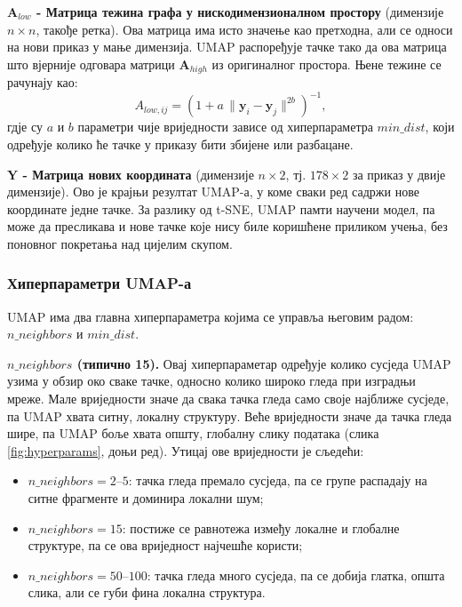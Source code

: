 \documentclass{article}
\begin{document}
	\textbf{$\mathbf{A}_{low}$ - Матрица тежина графа у нискодимензионалном простору} (димензије $n \times n$, такође ретка). Ова матрица има исто значење као претходна, али се односи на нови приказ у мање димензија. UMAP распоређује тачке тако да ова матрица што вјерније одговара матрици $\mathbf{A}_{high}$ из оригиналног простора. Њене тежине се рачунају као:
	\begin{equation} \label{eq:umap_alow}
		A_{low,ij} = \left(1 + a\,\|\mathbf{y}_i - \mathbf{y}_j\|^{2b}\right)^{-1},
	\end{equation}
	гдје су $a$ и $b$ параметри чије вриједности зависе од хиперпараметра $min\_dist$, који одређује колико ће тачке у приказу бити збијене или разбацане.
	
	\textbf{$\mathbf{Y}$ - Матрица нових координата} (димензије $n \times 2$, тј. $178 \times 2$ за приказ у двије димензије). Ово је крајњи резултат UMAP-а, у коме сваки ред садржи нове координате једне тачке. За разлику од t-SNE, UMAP памти научени модел, па може да пресликава и нове тачке које нису биле коришћене приликом учења, без поновног покретања над цијелим скупом.
	
	
	\subsubsection{Хиперпараметри UMAP-а}

	UMAP има два главна хиперпараметра којима се управља његовим радом: $n\_neighbors$ и $min\_dist$.
	
	\textbf{$n\_neighbors$ (типично 15).} Овај хиперпараметар одређује колико сусједа UMAP узима у обзир око сваке тачке, односно колико широко гледа при изградњи мреже. Мале вриједности значе да свака тачка гледа само своје најближе сусједе, па UMAP хвата ситну, локалну структуру. Веће вриједности значе да тачка гледа шире, па UMAP боље хвата општу, глобалну слику података (слика \ref{fig:hyperparams}, доњи ред). Утицај ове вриједности је сљедећи:
	\begin{itemize}
		\item $n\_neighbors = 2$--$5$: тачка гледа премало сусједа, па се групе распадају на ситне фрагменте и доминира локални шум;
		\item $n\_neighbors = 15$: постиже се равнотежа између локалне и глобалне структуре, па се ова вриједност најчешће користи;
		\item $n\_neighbors = 50$--$100$: тачка гледа много сусједа, па се добија глатка, општа слика, али се губи фина локална структура.
	\end{itemize}
	
\end{document}
